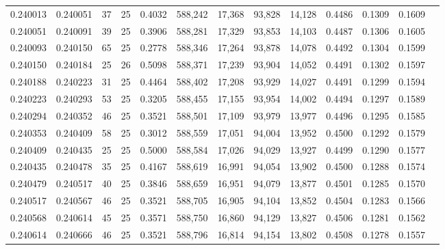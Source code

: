 \begin{tabular}{rrrrrrrrrrrrr}
0.240013 & 0.240051 &    37 &  25 &                                     0.4032 & 588,242 &  17,368 &  93,828 &  14,128 & 0.4486 & 0.1309 & 0.1609 \\
0.240051 & 0.240091 &    39 &  25 &                                     0.3906 & 588,281 &  17,329 &  93,853 &  14,103 & 0.4487 & 0.1306 & 0.1605 \\
0.240093 & 0.240150 &    65 &  25 &                                     0.2778 & 588,346 &  17,264 &  93,878 &  14,078 & 0.4492 & 0.1304 & 0.1599 \\
0.240150 & 0.240184 &    25 &  26 &                                     0.5098 & 588,371 &  17,239 &  93,904 &  14,052 & 0.4491 & 0.1302 & 0.1597 \\
0.240188 & 0.240223 &    31 &  25 &                                     0.4464 & 588,402 &  17,208 &  93,929 &  14,027 & 0.4491 & 0.1299 & 0.1594 \\
0.240223 & 0.240293 &    53 &  25 &                                     0.3205 & 588,455 &  17,155 &  93,954 &  14,002 & 0.4494 & 0.1297 & 0.1589 \\
0.240294 & 0.240352 &    46 &  25 &                                     0.3521 & 588,501 &  17,109 &  93,979 &  13,977 & 0.4496 & 0.1295 & 0.1585 \\
0.240353 & 0.240409 &    58 &  25 &                                     0.3012 & 588,559 &  17,051 &  94,004 &  13,952 & 0.4500 & 0.1292 & 0.1579 \\
0.240409 & 0.240435 &    25 &  25 &                                     0.5000 & 588,584 &  17,026 &  94,029 &  13,927 & 0.4499 & 0.1290 & 0.1577 \\
0.240435 & 0.240478 &    35 &  25 &                                     0.4167 & 588,619 &  16,991 &  94,054 &  13,902 & 0.4500 & 0.1288 & 0.1574 \\
0.240479 & 0.240517 &    40 &  25 &                                     0.3846 & 588,659 &  16,951 &  94,079 &  13,877 & 0.4501 & 0.1285 & 0.1570 \\
0.240517 & 0.240567 &    46 &  25 &                                     0.3521 & 588,705 &  16,905 &  94,104 &  13,852 & 0.4504 & 0.1283 & 0.1566 \\
0.240568 & 0.240614 &    45 &  25 &                                     0.3571 & 588,750 &  16,860 &  94,129 &  13,827 & 0.4506 & 0.1281 & 0.1562 \\
0.240614 & 0.240666 &    46 &  25 &                                     0.3521 & 588,796 &  16,814 &  94,154 &  13,802 & 0.4508 & 0.1278 & 0.1557 \\

\end{tabular}

